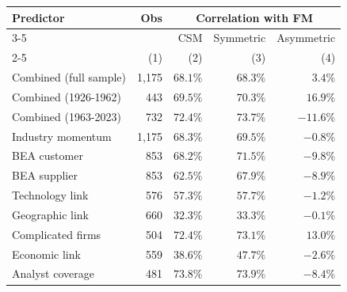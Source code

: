 \documentclass[
]{article}
\begin{document}
\begin{tabular}{lrrrr}
  \toprule \multirow{2}{*}{Predictor} & \multirow{2}{*}{Obs} & \multicolumn{3}{c}{Correlation with FM} \\
 \cmidrule(l){3-5} & & CSM & Symmetric & Asymmetric \\
 \cmidrule(l){2-5} \vspace{5pt}  & (1) & (2) & (3) & (4) \\ 
  Combined (full sample) & 1,175 & $68.1\%$ & $68.3\%$ & $3.4\%$ \\ 
  Combined (1926-1962) & 443 & $69.5\%$ & $70.3\%$ & $16.9\%$ \\ 
   \vspace{5pt}Combined (1963-2023) & 732 & $72.4\%$ & $73.7\%$ & $-11.6\%$ \\ 
  Industry momentum & 1,175 & $68.3\%$ & $69.5\%$ & $-0.8\%$ \\ 
  BEA customer & 853 & $68.2\%$ & $71.5\%$ & $-9.8\%$ \\ 
  BEA supplier & 853 & $62.5\%$ & $67.9\%$ & $-8.9\%$ \\ 
  Technology link & 576 & $57.3\%$ & $57.7\%$ & $-1.2\%$ \\ 
  Geographic link & 660 & $32.3\%$ & $33.3\%$ & $-0.1\%$ \\ 
  Complicated firms & 504 & $72.4\%$ & $73.1\%$ & $13.0\%$ \\ 
  Economic link & 559 & $38.6\%$ & $47.7\%$ & $-2.6\%$ \\ 
  Analyst coverage & 481 & $73.8\%$ & $73.9\%$ & $-8.4\%$ \\ 
   \bottomrule\end{tabular}
\end{document}
